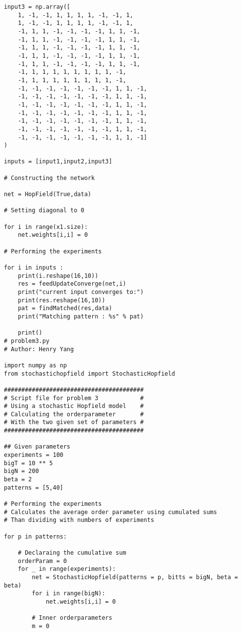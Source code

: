 \documentclass{article}
\begin{document}
\begin{verbatim}
input3 = np.array([
    1, -1, -1, 1, 1, 1, 1, -1, -1, 1,
    1, -1, -1, 1, 1, 1, 1, -1, -1, 1,
    -1, 1, 1, -1, -1, -1, -1, 1, 1, -1,
    -1, 1, 1, -1, -1, -1, -1, 1, 1, -1,
    -1, 1, 1, -1, -1, -1, -1, 1, 1, -1,
    -1, 1, 1, -1, -1, -1, -1, 1, 1, -1,
    -1, 1, 1, -1, -1, -1, -1, 1, 1, -1,
    -1, 1, 1, 1, 1, 1, 1, 1, 1, -1,
    -1, 1, 1, 1, 1, 1, 1, 1, 1, -1,
    -1, -1, -1, -1, -1, -1, -1, 1, 1, -1,
    -1, -1, -1, -1, -1, -1, -1, 1, 1, -1,
    -1, -1, -1, -1, -1, -1, -1, 1, 1, -1,
    -1, -1, -1, -1, -1, -1, -1, 1, 1, -1,
    -1, -1, -1, -1, -1, -1, -1, 1, 1, -1,
    -1, -1, -1, -1, -1, -1, -1, 1, 1, -1,
    -1, -1, -1, -1, -1, -1, -1, 1, 1, -1]
)

inputs = [input1,input2,input3]

# Constructing the network

net = HopField(True,data)

# Setting diagonal to 0

for i in range(x1.size):
    net.weights[i,i] = 0

# Performing the experiments

for i in inputs :
    print(i.reshape(16,10))
    res = feedUpdateConverge(net,i)
    print("current input converges to:")
    print(res.reshape(16,10))
    pat = findMatched(res,data)
    print("Matching pattern : %s" % pat)

    print()
# problem3.py
# Author: Henry Yang

import numpy as np
from stochastichopfield import StochasticHopfield

########################################
# Script file for problem 3            #
# Using a stochastic Hopfield model    #
# Calculating the orderparameter       #
# With the two given set of parameters #
########################################

## Given parameters
experiments = 100
bigT = 10 ** 5
bigN = 200
beta = 2
patterns = [5,40]

# Performing the experiments
# Calculates the average order parameter using cumulated sums
# Than dividing with numbers of experiments

for p in patterns:

    # Declaraing the cumulative sum
    orderParam = 0
    for _ in range(experiments):
        net = StochasticHopfield(patterns = p, bitts = bigN, beta = beta)
        for i in range(bigN):
            net.weights[i,i] = 0

        # Inner orderparameters
        m = 0


\end{verbatim}
\end{document}
